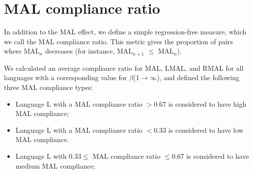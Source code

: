 \section{MAL compliance ratio}\label{decrease}
In addition to the MAL effect, we define a simple regression-free measure, which we call the MAL compliance ratio. This metric gives the proportion of pairs where MAL$_n$ decreases (for instance, MAL$_{n+1}$ $\leq$ MAL$_n$). 

We calculated an average compliance ratio for MAL, LMAL, and RMAL for all languages with a corresponding value for $\beta$(1$\rightarrow\infty$), and defined the following three MAL compliance types:

\begin{itemize}
    \item Language L with a MAL compliance ratio $> 0.67$ is considered to have high MAL compliance;
    \item Language L with a MAL compliance ratio $< 0.33$ is considered to have low MAL compliance.
    \item Language L with $0.33 \leq$ MAL compliance ratio $\leq 0.67$ is considered to have medium MAL compliance;
\end{itemize}

